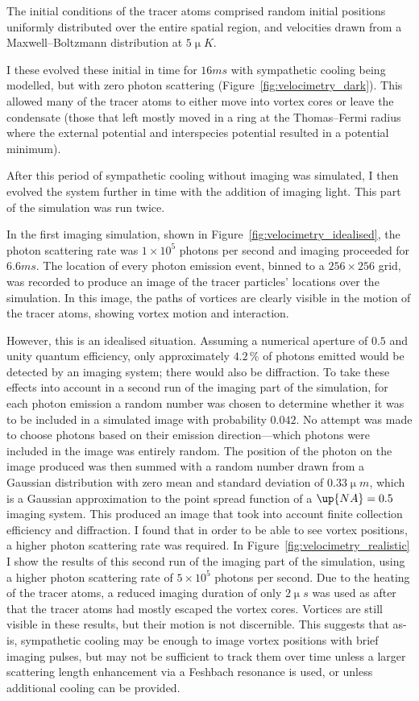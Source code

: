 The initial conditions of the tracer atoms comprised random initial positions uniformly distributed over the entire spatial region, and velocities drawn from a Maxwell--Boltzmann distribution at $5\unit{\upmu K}$.

I these evolved these initial in time for $16\unit{ms}$ with sympathetic cooling being modelled, but with zero photon scattering (Figure~\ref{fig:velocimetry_dark}). This allowed many of the tracer atoms to either move into vortex cores or leave the condensate (those that left mostly moved in a ring at the Thomas--Fermi radius where the external potential and interspecies potential resulted in a potential minimum).

After this period of sympathetic cooling without imaging was simulated, I then evolved the system further in time with the addition of imaging light. This part of the simulation was run twice.

In the first imaging simulation, shown in Figure~\ref{fig:velocimetry_idealised}, the photon scattering rate was $1\times10^5$ photons per second and imaging proceeded for $6.6\unit{ms}$. The location of every photon emission event, binned to a $256\times256$ grid, was recorded to produce an image of the tracer particles' locations over the simulation. In this image, the paths of vortices are clearly visible in the motion of the tracer atoms, showing vortex motion and interaction.

However, this is an idealised situation. Assuming a numerical aperture of $0.5$ and unity quantum efficiency, only approximately $4.2\,\%$ of photons emitted would be detected by an imaging system; there would also be diffraction. To take these effects into account in a second run of the imaging part of the simulation, for each photon emission a random number was chosen to determine whether it was to be included in a simulated image with probability $0.042$. No attempt was made to choose photons based on their emission direction---which photons were included in the image was entirely random. The position of the photon on the image produced was then summed with a random number drawn from a Gaussian distribution with zero mean and standard deviation of $0.33\unit{\upmu m}$, which is a Gaussian approximation to the point spread function of a $\up{NA}=0.5$ imaging system. This produced an image that took into account finite collection efficiency and diffraction. I found that in order to be able to see vortex positions, a higher photon scattering rate was required. In Figure~\ref{fig:velocimetry_realistic} I show the results of this second run of the imaging part of the simulation, using a higher photon scattering rate of $5\times10^5$ photons per second. Due to the heating of the tracer atoms, a reduced imaging duration of only $2\unit{\upmu s}$ was used as after that the tracer atoms had mostly escaped the vortex cores. Vortices are still visible in these results, but their motion is not discernible. This suggests that as-is, sympathetic cooling may be enough to image vortex positions with brief imaging pulses, but may not be sufficient to track them over time unless a larger scattering length enhancement via a Feshbach resonance is used, or unless additional cooling can be provided.

